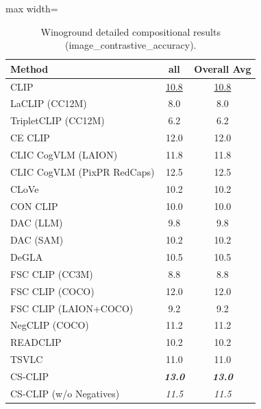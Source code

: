 \begin{table}[t]
  \centering
  \scriptsize
  \caption{Winoground detailed compositional results (image_contrastive_accuracy).}
  \label{tab:Winoground_detailed}
  \begin{adjustbox}{max width=\textwidth}
  \setlength{\tabcolsep}{2pt}
  \begin{tabular}{p{5cm}c|c}
    \toprule
    Method & all & Overall Avg \\
    \midrule
    CLIP & \underline{10.8} & \underline{10.8} \\
    \midrule
    LaCLIP (CC12M) & 8.0 & 8.0 \\
    TripletCLIP (CC12M) & 6.2 & 6.2 \\
    \midrule
    CE CLIP & 12.0 & 12.0 \\
    CLIC CogVLM (LAION) & 11.8 & 11.8 \\
    CLIC CogVLM (PixPR RedCaps) & 12.5 & 12.5 \\
    CLoVe & 10.2 & 10.2 \\
    CON CLIP & 10.0 & 10.0 \\
    DAC (LLM) & 9.8 & 9.8 \\
    DAC (SAM) & 10.2 & 10.2 \\
    DeGLA & 10.5 & 10.5 \\
    FSC CLIP (CC3M) & 8.8 & 8.8 \\
    FSC CLIP (COCO) & 12.0 & 12.0 \\
    FSC CLIP (LAION+COCO) & 9.2 & 9.2 \\
    NegCLIP (COCO) & 11.2 & 11.2 \\
    READCLIP & 10.2 & 10.2 \\
    TSVLC & 11.0 & 11.0 \\
    \midrule
    CS-CLIP & \emph{\textbf{13.0}} & \emph{\textbf{13.0}} \\
    CS-CLIP (w/o Negatives) & \emph{11.5} & \emph{11.5} \\
    \bottomrule
  \end{tabular}
  \end{adjustbox}
\end{table}

